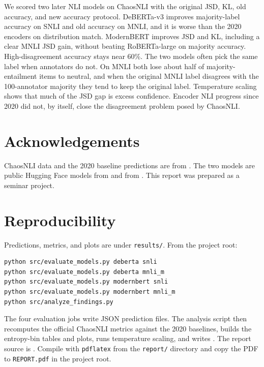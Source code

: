 \documentclass[11pt,a4paper]{article}
\begin{document}
We scored two later NLI models on ChaosNLI with the original JSD, KL, old accuracy, and new accuracy protocol. DeBERTa-v3 improves majority-label accuracy on SNLI and old accuracy on MNLI, and it is worse than the 2020 encoders on distribution match. ModernBERT improves JSD and KL, including a clear MNLI JSD gain, without beating RoBERTa-large on majority accuracy. High-disagreement accuracy stays near 60\%. The two models often pick the same label when annotators do not. On MNLI both lose about half of majority-entailment items to neutral, and when the original MNLI label disagrees with the 100-annotator majority they tend to keep the original label. Temperature scaling shows that much of the JSD gap is excess confidence. Encoder NLI progress since 2020 did not, by itself, close the disagreement problem posed by ChaosNLI.

\section*{Acknowledgements}

ChaosNLI data and the 2020 baseline predictions are from \citet{nie2020chaosnli}. The two models are public Hugging Face models from \citet{laurer2024less} and from \citet{sileo2024tasksource}. This report was prepared as a seminar project.

\appendix
\section{Reproducibility}

Predictions, metrics, and plots are under \texttt{results/}. From the project root:

\begin{verbatim}
python src/evaluate_models.py deberta snli
python src/evaluate_models.py deberta mnli_m
python src/evaluate_models.py modernbert snli
python src/evaluate_models.py modernbert mnli_m
python src/analyze_findings.py
\end{verbatim}

The four evaluation jobs write JSON prediction files. The analysis script then recomputes the official ChaosNLI metrics against the 2020 baselines, builds the entropy-bin tables and plots, runs temperature scaling, and writes . The report source is . Compile with \texttt{pdflatex} from the \texttt{report/} directory and copy the PDF to \texttt{REPORT.pdf} in the project root.
\end{document}
